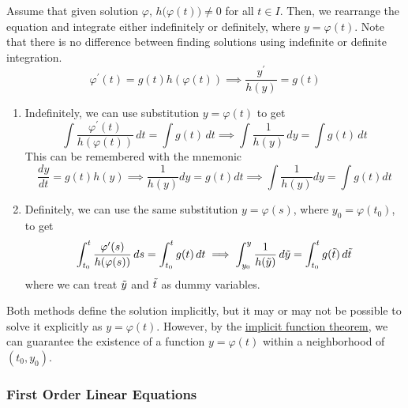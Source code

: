 \documentclass{article}
\newcounter{theorem}[section]
\newcounter{definition}[section]
\begin{document}
\begin{definition}
      Assume that given solution $\varphi$, $h\big( \varphi(t)\big) \neq 0$ for all $t \in I$. Then, we rearrange the equation and integrate either indefinitely or definitely, where $y = \varphi(t)$. Note that there is no difference between finding solutions using indefinite or definite integration. 
      \begin{equation}
        \varphi^\prime (t) = g(t) h(\varphi(t)) \implies \frac{y^\prime}{h(y)} = g(t)
      \end{equation}
      \begin{enumerate}
          \item Indefinitely, we can use substitution $y = \varphi(t)$ to get
          \begin{equation}
            \int \frac{\varphi^\prime (t)}{h(\varphi(t))} \, dt = \int g (t) \, dt \implies \int \frac{1}{h(y)} \,dy = \int g(t)\,dt
          \end{equation}
          This can be remembered with the mnemonic
          \begin{equation}
            \frac{dy}{dt} = g(t) h(y) \implies \frac{1}{h(y)} dy = g(t) dt \implies \int \frac{1}{h(y)} dy = \int g(t) dt
          \end{equation}
          \item Definitely, we can use the same substitution $y = \varphi(s)$, where $y_0 = \varphi(t_0)$, to get
          \begin{equation}
            \int_{t_0}^t \frac{\varphi^\prime (s)}{h(\varphi(s))} \, ds = \int_{t_0}^t g(t)\, dt \implies \int_{y_0}^y \frac{1}{h(\Tilde{y})} \, d\Tilde{y} = \int_{t_0}^t g(\Tilde{t})\, d\Tilde{t}
          \end{equation}
          where we can treat $\Tilde{y}$ and $\Tilde{t}$ as dummy variables. 
      \end{enumerate}
      Both methods define the solution implicitly, but it may or may not be possible to solve it explicitly as $y = \varphi(t)$. However, by the \hyperref[mv-thm:implicit-function-theorem]{implicit function theorem}, we can guarantee the existence of a function $y = \varphi(t)$ within a neighborhood of $(t_0, y_0)$. 
      \end{definition}

    \subsubsection{First Order Linear Equations}
\end{document}
